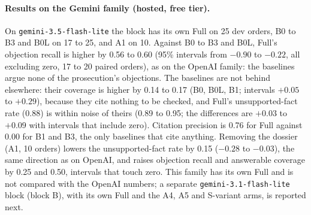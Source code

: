 \paragraph{Results on the Gemini family (hosted, free tier).} On \texttt{gemini-3.5-flash-lite} the block has its own Full on 25 dev orders, B0 to B3 and B0L on 17 to 25, and A1 on 10. Against B0 to B3 and B0L, Full's objection recall is higher by 0.56 to 0.60 (95\% intervals from $-0.90$ to $-0.22$, all excluding zero, 17 to 20 paired orders), as on the OpenAI family: the baselines argue none of the prosecution's objections. The baselines are not behind elsewhere: their coverage is higher by 0.14 to 0.17 (B0, B0L, B1; intervals $+0.05$ to $+0.29$), because they cite nothing to be checked, and Full's unsupported-fact rate (0.88) is within noise of theirs (0.89 to 0.95; the differences are $+0.03$ to $+0.09$ with intervals that include zero). Citation precision is 0.76 for Full against 0.00 for B1 and B3, the only baselines that cite anything. Removing the dossier (A1, 10 orders) lowers the unsupported-fact rate by 0.15 ($-0.28$ to $-0.03$), the same direction as on OpenAI, and raises objection recall and answerable coverage by 0.25 and 0.50, intervals that touch zero. This family has its own Full and is not compared with the OpenAI numbers; a separate \texttt{gemini-3.1-flash-lite} block (block B), with its own Full and the A4, A5 and S-variant arms, is reported next.

